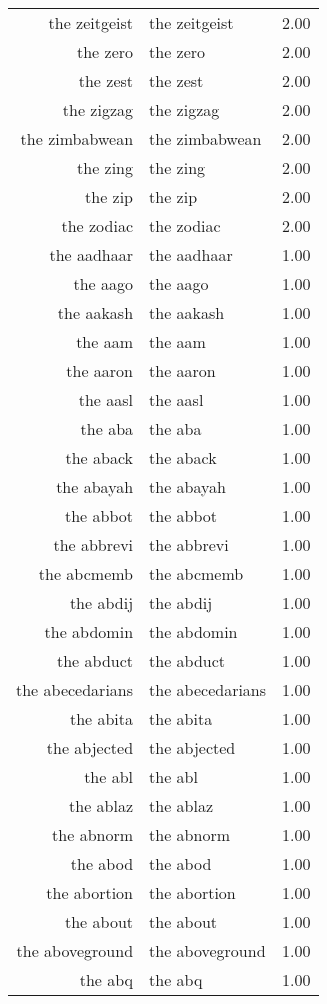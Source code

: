 \begin{table}[ht]
\begin{tabular}{rlr}
  the zeitgeist & the zeitgeist & 2.00 \\ 
  the zero & the zero & 2.00 \\ 
  the zest & the zest & 2.00 \\ 
  the zigzag & the zigzag & 2.00 \\ 
  the zimbabwean & the zimbabwean & 2.00 \\ 
  the zing & the zing & 2.00 \\ 
  the zip & the zip & 2.00 \\ 
  the zodiac & the zodiac & 2.00 \\ 
  the aadhaar & the aadhaar & 1.00 \\ 
  the aago & the aago & 1.00 \\ 
  the aakash & the aakash & 1.00 \\ 
  the aam & the aam & 1.00 \\ 
  the aaron & the aaron & 1.00 \\ 
  the aasl & the aasl & 1.00 \\ 
  the aba & the aba & 1.00 \\ 
  the aback & the aback & 1.00 \\ 
  the abayah & the abayah & 1.00 \\ 
  the abbot & the abbot & 1.00 \\ 
  the abbrevi & the abbrevi & 1.00 \\ 
  the abcmemb & the abcmemb & 1.00 \\ 
  the abdij & the abdij & 1.00 \\ 
  the abdomin & the abdomin & 1.00 \\ 
  the abduct & the abduct & 1.00 \\ 
  the abecedarians & the abecedarians & 1.00 \\ 
  the abita & the abita & 1.00 \\ 
  the abjected & the abjected & 1.00 \\ 
  the abl & the abl & 1.00 \\ 
  the ablaz & the ablaz & 1.00 \\ 
  the abnorm & the abnorm & 1.00 \\ 
  the abod & the abod & 1.00 \\ 
  the abortion & the abortion & 1.00 \\ 
  the about & the about & 1.00 \\ 
  the aboveground & the aboveground & 1.00 \\ 
  the abq & the abq & 1.00 \\ 

\end{tabular}
\end{table}
